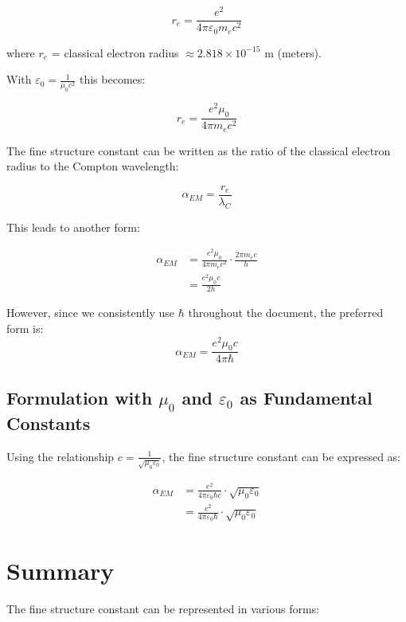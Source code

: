 \documentclass[12pt,a4paper]{article}
\begin{document}
	\begin{equation}
		r_e = \frac{e^2}{4\pi\varepsilon_0 m_e c^2}
	\end{equation}
	
	where $r_e$ = classical electron radius $\approx 2.818 \times 10^{-15}$ m (meters).
	
	With $\varepsilon_0 = \frac{1}{\mu_0c^2}$ this becomes:
	
	\begin{equation}
		r_e = \frac{e^2\mu_0}{4\pi m_e c^2}
	\end{equation}
	
	The fine structure constant can be written as the ratio of the classical electron radius to the Compton wavelength:
	
	\begin{equation}
		\alpha_{EM} = \frac{r_e}{\lambda_C}
	\end{equation}
	
	This leads to another form:
	
	\begin{align}
		\alpha_{EM} &= \frac{e^2\mu_0}{4\pi m_e c^2} \cdot \frac{2\pi m_e c}{h}\\
		&= \frac{e^2\mu_0 c}{2h}
	\end{align}
	
	However, since we consistently use $\hbar$ throughout the document, the preferred form is:
	\begin{equation}
		\alpha_{EM} = \frac{e^2\mu_0 c}{4\pi\hbar}
	\end{equation}
	
	\subsection{Formulation with $\mu_0$ and $\varepsilon_0$ as Fundamental Constants}
	Using the relationship $c = \frac{1}{\sqrt{\mu_0\varepsilon_0}}$, the fine structure constant can be expressed as:
	
	\begin{align}
		\alpha_{EM} &= \frac{e^2}{4\pi\varepsilon_0\hbar c} \cdot \sqrt{\mu_0\varepsilon_0}\\
		&= \frac{e^2}{4\pi\varepsilon_0\hbar} \cdot \sqrt{\mu_0\varepsilon_0}
	\end{align}
	
	\section{Summary}
	The fine structure constant can be represented in various forms:
	
\end{document}
